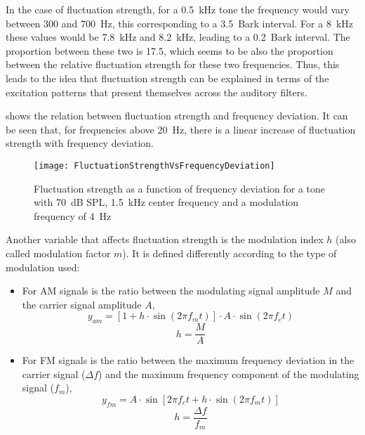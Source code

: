 \documentclass[../main.tex]{subfiles}
\begin{document}
\begin{theoreticalbackground}
In the case of fluctuation strength, for a 0.5~kHz tone the frequency would vary
between 300 and 700~Hz, this corresponding to a 3.5~Bark interval. For a 8~kHz
these values would be 7.8~kHz and 8.2~kHz, leading to a 0.2~Bark interval. The
proportion between these two is 17.5, which seems to be also the proportion
between the relative fluctuation strength for these two frequencies. Thus, this
leads to the idea that fluctuation strength can be explained in terms of the
excitation patterns that present themselves across the auditory filters.

 shows the relation between fluctuation strength
and frequency deviation. It can be seen that, for frequencies above 20~Hz, there
is a linear increase of fluctuation strength with frequency deviation.

\begin{figure}[!ht]
  \centering
  \texttt{[image: FluctuationStrengthVsFrequencyDeviation]}
    \caption{Fluctuation strength as a function of frequency deviation for a
      tone with 70~dB SPL, 1.5~kHz center frequency and a modulation frequency
      of 4~Hz~\cite[pp. 251]{Fastl2007Psychoacoustics}}
\label{fig:flucstrenvsfreqdev}
\end{figure}

Another variable that affects fluctuation strength is the modulation index $h$
(also called modulation factor $m$). It is defined differently according to the
type of modulation used:
\begin{itemize}
  \item For \gls{AM} signals is the ratio between the modulating signal
    amplitude $M$ and the carrier signal amplitude $A$,
      \begin{equation}
        y_{am} = [1+h \cdot \sin(2\pi f_m t)]\cdot A \cdot \sin(2\pi f_c t)
      \end{equation}
      \begin{equation}
        h=\frac{M}{A}
      \end{equation}
  \item For \gls{FM} signals is the ratio between the maximum frequency
    deviation in the carrier signal ($\Delta f$) and the maximum frequency
    component of the modulating signal ($f_m$),
      \begin{equation}
        y_{fm} = A \cdot \sin[2\pi f_c t + h \cdot \sin(2 \pi f_m t)]
      \end{equation}
      \begin{equation}
        h=\frac{\Delta f}{f_m}
      \end{equation}
\end{itemize}


\end{theoreticalbackground}
\end{document}

